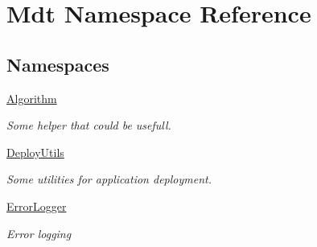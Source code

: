 \hypertarget{namespace_mdt}{}\section{Mdt Namespace Reference}
\label{namespace_mdt}
\subsection*{Namespaces}
\begin{DoxyCompactItemize}
\item 
 \hyperlink{namespace_mdt_1_1_algorithm}{Algorithm}
\begin{DoxyCompactList}\small\item\em Some helper that could be usefull. \end{DoxyCompactList}\item 
 \hyperlink{namespace_mdt_1_1_deploy_utils}{Deploy\+Utils}
\begin{DoxyCompactList}\small\item\em Some utilities for application deployment. \end{DoxyCompactList}\item 
 \hyperlink{namespace_mdt_1_1_error_logger}{Error\+Logger}
\begin{DoxyCompactList}\small\item\em Error logging \end{DoxyCompactList}\end{DoxyCompactItemize}
